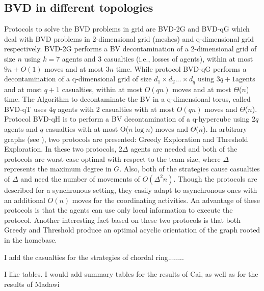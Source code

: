 \subsection{BVD in different topologies}
Protocols to solve the  BVD problems in grid are BVD-2G and BVD-qG which deal with BVD problems in 2-dimensional grid (meshes) and q-dimensional grid respectively. BVD-2G performs a BV decontamination of a 2-dimensional grid of size $n$ using $k=7$ agents and 3 casualties (i.e., losses of agents), within at most $9n+O(1)$ moves and at most $3n$ time. While protocol BVD-qG performs a decontamination of a q-dimensional grid of size $d_1\times d_2 ...\times d_q$ using $3q+1$agents and at most $q+1$ casualties, within at most $O(qn)$ moves and at most $\Theta$($n$) time. The Algorithm to decontaminate the BV in a q-dimensional torus, called BVD-qT uses $4q$ agents with 2 casualties with at most $O(qn)$ moves and $\Theta$($n$). Protocol BVD-qH is to perform a BV decontamination of a q-hypercube using $2q$ agents and $q$ casualties with at most O($n\log n$) moves and $\Theta$($n$). In arbitrary graphs (see \cite{cai1}), two protocols are presented: {\sc Greedy Exploration} and {\sc Threshold Exploration}. In these two protocols, $2\Delta$ agents are needed and both of the protocols are worst-case optimal with respect to the team size, where $\Delta$ represents the maximum degree in $G$. Also, both of the strategies cause casualties of $\Delta$ and need the number of movements of $O(\Delta ^{2}n)$. Though the protocols are described for a synchronous setting, they easily adapt to asynchronous ones with an additional $O(n)$ moves for the coordinating activities. An advantage of these protocols is that the agents can use only local information to execute the protocol. Another interesting fact based on these two protocols is that both {\sc Greedy} and {\sc Threshold}   produce an optimal acyclic orientation of the graph rooted in the homebase.

\color{blue} I add the casualties for the strategies of chordal ring........


I like tables. I would add summary tables for the results of Cai, as well as for the results of Madawi 
\color{black}

